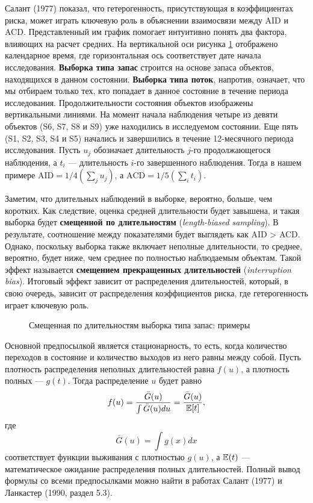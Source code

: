 Салант (1977) показал, что гетерогенность, присутствующая в коэффициентах риска, может играть ключевую роль в объяснении взаимосвязи между AID и ACD. Представленный им график помогает интуитивно понять два фактора, влияющих на расчет средних. На вертикальной оси рисунка \ref{fig:18.1} отображено календарное время, где горизонтальная ось соответствует дате начала исследования. \textbf{Выборка типа запас} строится на основе запаса объектов, находящихся в данном состоянии. \textbf{Выборка типа поток}, напротив, означает, что мы отбираем только тех, кто попадает в данное состояние в течение периода исследования. Продолжительности состояния объектов изображены вертикальными линиями. На момент начала наблюдения четыре из девяти объектов (S6, S7, S8 и S9) уже находились в исследуемом состоянии. Еще пять (S1, S2, S3, S4 и S5) начались и завершились в течение 12-месячного периода исследования. Пусть $u_j$ обозначает длительность $j$-го продолжающегося наблюдения, а $t_i$ --- длительность $i$-го завершенного наблюдения. Тогда в нашем примере $\mathrm{AID} = 1/4(\sum_ju_j)$, а $\mathrm{ACD} = 1/5(\sum_i t_i)$.

Заметим, что длительных наблюдений в выборке, вероятно, больше, чем коротких. Как следствие, оценка средней длительности будет завышена, и такая выборка будет \textbf{смещенной по длительностям} (\textit{length-biased sampling}). В результате, соотношение между показателями будет выглядеть как AID > ACD. Однако, поскольку выборка также включает неполные длительности, то среднее, вероятно, будет ниже, чем среднее по полностью наблюдаемым объектам. Такой эффект называется \textbf{смещением прекращенных длительностей} (\textit{interruption bias}). Итоговый эффект зависит от распределения длительностей, который, в свою очередь, зависит от распределения коэффициентов риска, где гетерогенность играет ключевую роль.

    \begin{figure}[ht!]\caption{Смещенная по длительностям выборка типа запас: примеры}\label{fig:18.1}
    \centering
    \end{figure}

Основной предпосылкой является стационарность, то есть, когда количество переходов в состояние и количество выходов из него равны между собой. Пусть плотность распределения неполных длительностей равна $f(u)$, а плотность полных --- $g(t)$. Тогда распределение $u$ будет равно
    \begin{align}
        \label{eq:18.27}
        f(u) = \frac{\bar{G}(u)}{\int \bar{G}(u)du} = \frac{\bar{G}(u)}{\mathbb{E}[t]},
    \end{align}
где
    $$\bar{G}(u) = \int g(x)dx$$
соответствует функции выживания с плотностью $g(u)$, а $\mathbb{E}(t)$ --- математическое ожидание распределения полных длительностей. Полный вывод формулы со всеми предпосылками можно найти в работах Салант (1977) и Ланкастер (1990, раздел 5.3).

